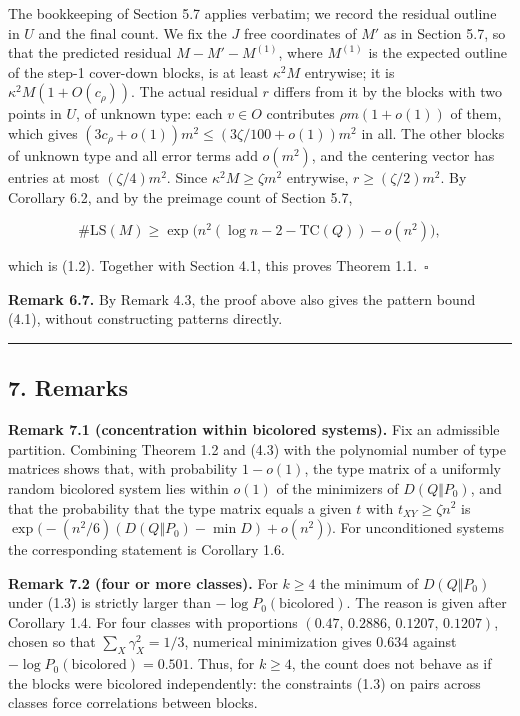 \documentclass[english,11pt,a4paper]{article}
\begin{document}
The bookkeeping of Section 5.7 applies verbatim; we record the residual outline in \(U\) and the final count. We fix the \(J\) free coordinates of \(M'\) as in Section 5.7, so that the predicted residual \(M-M'-M^{(1)}\), where \(M^{(1)}\) is the expected outline of the step-1 cover-down blocks, is at least \(\kappa^2M\) entrywise; it is \(\kappa^2M(1+O(c_\rho))\). The actual residual \(r\) differs from it by the blocks with two points in \(U\), of unknown type: each \(v\in O\) contributes \(\rho m(1+o(1))\) of them, which gives \((3c_\rho+o(1))m^2\le(3\zeta/100+o(1))m^2\) in all. The other blocks of unknown type and all error terms add \(o(m^2)\), and the centering vector has entries at most \((\zeta/4)m^2\). Since \(\kappa^2M\ge\zeta m^2\) entrywise, \(r\ge(\zeta/2)m^2\). By Corollary 6.2, and by the preimage count of Section 5.7,

\nopagebreak[4]
\[\#\mathrm{LS}(M)\ge\exp\bigl(n^2(\log n-2-\mathrm{TC}(Q))-o(n^2)\bigr),\]

which is (1.2). Together with Section 4.1, this proves Theorem 1.1.~\(\square\)

\textbf{Remark 6.7.} By Remark 4.3, the proof above also gives the pattern bound (4.1), without constructing patterns directly.

\begin{center}\rule{0.5\linewidth}{0.5pt}\end{center}

\subsection{7. Remarks}\label{remarks}

\textbf{Remark 7.1 (concentration within bicolored systems).} Fix an admissible partition. Combining Theorem 1.2 and (4.3) with the polynomial number of type matrices shows that, with probability \(1-o(1)\), the type matrix of a uniformly random bicolored system lies within \(o(1)\) of the minimizers of \(D(Q\Vert P_0)\), and that the probability that the type matrix equals a given \(t\) with \(t_{XY}\ge\zeta n^2\) is \(\exp\bigl(-(n^2/6)(D(Q\Vert P_0)-\min D)+o(n^2)\bigr)\). For unconditioned systems the corresponding statement is Corollary 1.6.

\textbf{Remark 7.2 (four or more classes).} For \(k\ge4\) the minimum of \(D(Q\Vert P_0)\) under (1.3) is strictly larger than \(-\log P_0(\text{bicolored})\). The reason is given after Corollary 1.4. For four classes with proportions \((0.47,\,0.2886,\,0.1207,\,0.1207)\), chosen so that \(\sum_X\gamma_X^2=1/3\), numerical minimization gives \(0.634\) against \(-\log P_0(\text{bicolored})=0.501\). Thus, for \(k\ge4\), the count does not behave as if the blocks were bicolored independently: the constraints (1.3) on pairs across classes force correlations between blocks.
\end{document}
